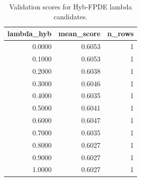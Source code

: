 \begin{table}[t]
\caption{Validation scores for Hyb-FPDE lambda candidates.}
\label{tab:lambda_distribution_computed}
\centering
\begin{tabular}{rrr}
\toprule
lambda\_hyb & mean\_score & n\_rows \\
\midrule
0.0000 & 0.6053 & 1 \\
0.1000 & 0.6053 & 1 \\
0.2000 & 0.6038 & 1 \\
0.3000 & 0.6046 & 1 \\
0.4000 & 0.6035 & 1 \\
0.5000 & 0.6041 & 1 \\
0.6000 & 0.6047 & 1 \\
0.7000 & 0.6035 & 1 \\
0.8000 & 0.6027 & 1 \\
0.9000 & 0.6027 & 1 \\
1.0000 & 0.6027 & 1 \\
\bottomrule
\end{tabular}

\end{table}
